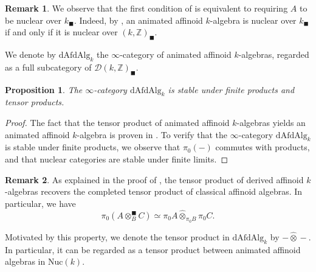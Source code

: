 \documentclass[oneside, hidelinks, 12pt, a4paper,reqno]{amsart}
\theoremstyle{plain}
\theoremstyle{definition}
\newtheorem{remark}[remark]{Remark}
\theoremstyle{plain}
\newtheorem{proposition}[proposition]{Proposition}
\newcommand{\Z}{\mathbb Z}
\newcommand{\cD}{\mathscr D}
\newcommand{\cat}{$\infty$-category }
\newcommand{\Nuc}{\mathrm{Nuc}}
\newcommand{\Solid}{\blacksquare}
\begin{document}
\begin{remark}\label{rmk: animated affinoid nuclear over k}
    We observe that the first condition of  is equivalent to requiring $A$ to be nuclear over $k_\Solid$. Indeed, by \cite[Corollary 2.7]{mikami2023fppfdescentcondensedanimatedrings}, an animated affinoid $k$-algebra is nuclear over $k_\Solid$ if and only if it is nuclear over $(k,\Z)_\Solid$.
\end{remark}

We denote by $\mathrm{dAfdAlg}_{k}$ the \cat of animated affinoid $k$-algebras, regarded as a full subcategory of $\cD(k,\Z)_{\Solid}$. 

\begin{proposition}\label{prop: animated affinoid stable under products and tensor products}
    The \cat $\mathrm{dAfdAlg}_{k}$ is stable under finite products and tensor products.
\end{proposition}
\begin{proof}
    The fact that the tensor product of animated affinoid $k$-algebras yields an animated affinoid $k$-algebra is proven in \cite[Proposition 2.14]{mikami2023fppfdescentcondensedanimatedrings}. To verify that the \cat $\mathrm{dAfdAlg}_{k}$ is stable under finite products, we observe that $\pi_0(-)$ commutes with products, and that nuclear categories are stable under finite limits.
\end{proof}

\begin{remark}\label{rmk: completed tensor}
As explained in the proof of \cite[Proposition 2.14]{mikami2023fppfdescentcondensedanimatedrings}, the tensor product of derived affinoid $k$-algebras recovers the completed tensor product of classical affinoid algebras. In particular, we have 
\[
\pi_0(A\otimes^{\Solid}_B C) \simeq \pi_0A\widehat{\otimes}_{\pi_{0}B} \pi_0{C}.
\]
\end{remark}
Motivated by this property, we denote the tensor product in $\mathrm{dAfdAlg}_{k}$ by $-\widehat{\otimes}-$. In particular, it can be regarded as a tensor product between animated affinoid algebras in $\Nuc(k)$.
\end{document}
